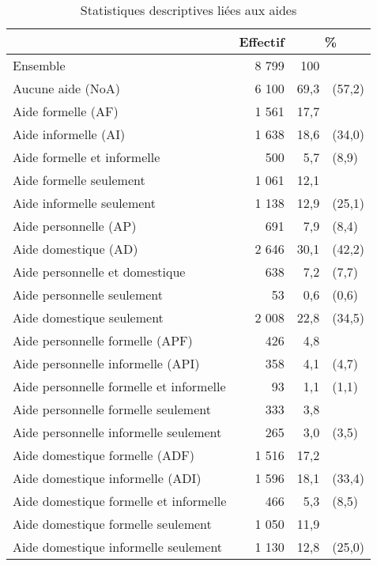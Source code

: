 \begin{Article}
\begin{refsection}[Bonnal]
\begin{table}[t]
\caption{Statistiques descriptives liées aux aides}
\label{stat_des_care}
\centering
\begin{threeparttable}[t]
\begin{tabularx}{\linewidth}{@{}X rrl@{}}
\toprule
	& {Effectif} & \multicolumn{2}{c}{\%} \\\midrule
	Ensemble & 8 799 & 100 & \\\midrule
	Aucune aide (NoA) & 6 100 & 69,3 & (57,2) \\\midrule
	Aide formelle (AF) & 1 561 & 17,7 & \\
	Aide informelle (AI) & 1 638 & 18,6 & (34,0) \\\midrule
	Aide formelle et informelle & 500 &  5,7 & (8,9) \\
	Aide formelle seulement & 1 061 & 12,1 & \\
	Aide informelle seulement & 1 138 & 12,9 & (25,1) \\\midrule
	Aide personnelle (AP) & 691 & 7,9 & (8,4) \\
	Aide domestique (AD) & 2 646 & 30,1 & (42,2) \\\midrule
	Aide personnelle et domestique & 638 & 7,2 & (7,7) \\
	Aide personnelle seulement & 53 &  0,6 &  (0,6) \\
	Aide domestique seulement & 2 008 & 22,8 & (34,5) \\\midrule
	Aide personnelle formelle (APF) & 426 & 4,8 & \\
	Aide personnelle informelle (API) & 358 & 4,1 & (4,7) \\
	Aide personnelle formelle et informelle & 93 & 1,1 & (1,1) \\
	Aide personnelle formelle seulement & 333 & 3,8 & \\
	Aide personnelle informelle seulement & 265 & 3,0 & (3,5) \\\midrule
	Aide domestique formelle (ADF) & 1 516 & 17,2 & \\
	Aide domestique informelle (ADI) & 1 596 & 18,1 & (33,4) \\
	Aide domestique formelle et informelle & 466 & 5,3 & (8,5) \\
	Aide domestique formelle seulement & 1 050 & 11,9 & \\
	Aide domestique informelle seulement & 1 130 & 12,8 & (25,0) \\\bottomrule

\end{tabularx}
\end{threeparttable}
\end{table}
\end{refsection}
\end{Article}

